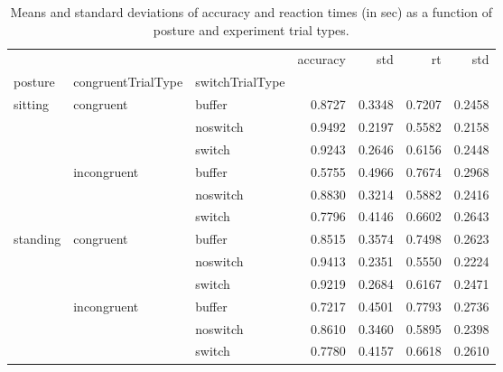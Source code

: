\begin{table}
\centering
\caption{Means and standard deviations of accuracy and reaction times (in sec) as a function of posture and experiment trial types.}
\label{table-task-switching-replication-reaction-time}
\begin{tabular}{lllrrrr}
\toprule
         &             &        & accuracy &    std &     rt &    std \\
posture & congruentTrialType & switchTrialType &          &        &        &        \\
\midrule
sitting & congruent & buffer &   0.8727 & 0.3348 & 0.7207 & 0.2458 \\
         &             & noswitch &   0.9492 & 0.2197 & 0.5582 & 0.2158 \\
         &             & switch &   0.9243 & 0.2646 & 0.6156 & 0.2448 \\
         & incongruent & buffer &   0.5755 & 0.4966 & 0.7674 & 0.2968 \\
         &             & noswitch &   0.8830 & 0.3214 & 0.5882 & 0.2416 \\
         &             & switch &   0.7796 & 0.4146 & 0.6602 & 0.2643 \\
standing & congruent & buffer &   0.8515 & 0.3574 & 0.7498 & 0.2623 \\
         &             & noswitch &   0.9413 & 0.2351 & 0.5550 & 0.2224 \\
         &             & switch &   0.9219 & 0.2684 & 0.6167 & 0.2471 \\
         & incongruent & buffer &   0.7217 & 0.4501 & 0.7793 & 0.2736 \\
         &             & noswitch &   0.8610 & 0.3460 & 0.5895 & 0.2398 \\
         &             & switch &   0.7780 & 0.4157 & 0.6618 & 0.2610 \\
\bottomrule
\end{tabular}
\end{table}
